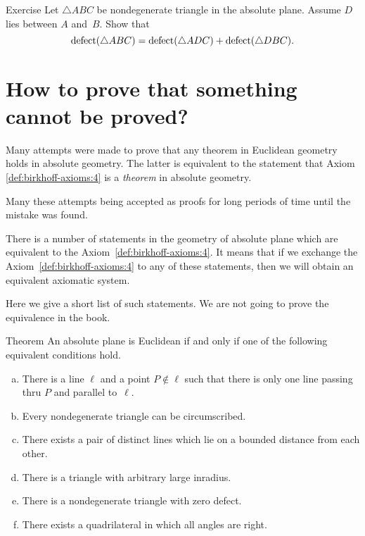 \begin{thm}{Exercise}\label{ex:defect}
Let $\triangle ABC$ be nondegenerate triangle in the absolute plane.
Assume $D$ lies between $A$ and~$B$.
Show that 
$$\mathop{\rm defect}\nolimits(\triangle ABC)=\mathop{\rm defect}\nolimits(\triangle ADC)+\mathop{\rm defect}\nolimits(\triangle DBC).$$

\end{thm}



\section*{How to prove that something\\ 
cannot be proved?}

Many attempts were made to prove that any theorem in Euclidean geometry holds in absolute geometry.
The latter is equivalent to the statement that Axiom \ref{def:birkhoff-axioms:4} is a {}\emph{theorem} in absolute geometry.

Many these attempts being accepted as proofs for long periods of time until the mistake was found.

There is a number of statements in the geometry of absolute plane which are equivalent to the Axiom~\ref{def:birkhoff-axioms:4}.
It means that if we exchange the Axiom~\ref{def:birkhoff-axioms:4}  to any of these statements, then we will obtain an equivalent axiomatic system.

Here we give a short list of such statements.
We are not going to prove the equivalence in the book.

\begin{thm}{Theorem}\label{thm:=IV}
An absolute plane is Euclidean if and only if one of the following equivalent conditions hold.
\begin{enumerate}[(a)]
\item\label{thm:=IV:main} 
There is a line $\ell$ 
and a point $P\notin\ell$ 
such that there is only one line passing thru $P$ 
and parallel to~$\ell$.
\item 
Every nondegenerate triangle can be circumscribed.
\item
There exists a pair of distinct lines which lie on a bounded distance from each other.
\item
There is a triangle with arbitrary large inradius.
\item
There is a nondegenerate triangle with zero defect.
\item
There exists a quadrilateral in which all angles are right.
\end{enumerate}
\end{thm}

